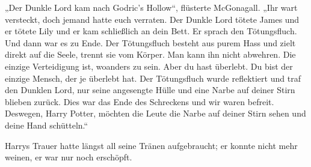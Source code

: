 „Der Dunkle Lord kam nach Godric’s Hollow“, flüsterte McGonagall. „Ihr wart versteckt, doch jemand hatte euch verraten. Der Dunkle Lord tötete James und er tötete Lily und er kam schließlich an dein Bett. Er sprach den Tötungsfluch. Und dann war es zu Ende. Der Tötungsfluch besteht aus purem Hass und zielt direkt auf die Seele, trennt sie vom Körper. Man kann ihn nicht abwehren. Die einzige Verteidigung ist, woanders zu sein. Aber du hast überlebt. Du bist der einzige Mensch, der je überlebt hat. Der Tötungsfluch wurde reflektiert und traf den Dunklen Lord, nur seine angesengte Hülle und eine Narbe auf deiner Stirn blieben zurück. Dies war das Ende des Schreckens und wir waren befreit. Deswegen, Harry Potter, möchten die Leute die Narbe auf deiner Stirn sehen und deine Hand schütteln.“

Harrys Trauer hatte längst all seine Tränen aufgebraucht; er konnte nicht mehr weinen, er war nur noch erschöpft.

